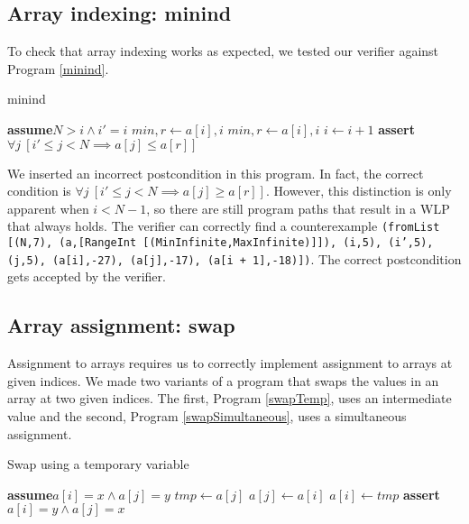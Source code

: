 \documentclass[a4paper]{article}
\newcommand{\Assert}{\State\textbf{assert}\xspace}
\newcommand{\Assume}{\State\textbf{assume}\xspace}
\begin{document}
\subsection{Array indexing: minind}

To check that array indexing works as expected, we tested our verifier against Program \ref{minind}.
\begin{algorithm}\label{minind}
\caption{minind}
\begin{algorithmic}
\Assume $N > i \wedge i' = i$
	\State $\textit{min}, r \gets a[i], i$
			\State $\textit{min}, r \gets a[i], i$
		\EndIf
		\State $i \gets i+1$
	\EndWhile
\EndVar
\Assert $\forall j\ [i' \leq j < N \implies a[j] \leq a[r]]$
\end{algorithmic}
\end{algorithm}

We inserted an incorrect postcondition in this program. In fact, the correct condition is $\forall j\ [i' \leq j < N \implies a[j] \geq a[r]]$. However, this distinction is only apparent when $i < N - 1$, so there are still program paths that result in a WLP that always holds. The verifier can correctly find a counterexample \texttt{(fromList [(N,7), (a,[RangeInt [(MinInfinite,MaxInfinite)]]), (i,5), (i',5), (j,5), (a[i],-27), (a[j],-17), (a[i + 1],-18)])}. The correct postcondition gets accepted by the verifier.

\subsection{Array assignment: swap}

Assignment to arrays requires us to correctly implement assignment to arrays at given indices. We made two variants of a program that swaps the values in an array at two given indices. The first, Program \ref{swapTemp}, uses an intermediate value and the second, Program \ref{swapSimultaneous}, uses a simultaneous assignment.

\begin{algorithm}\label{swapTemp}
\caption{Swap using a temporary variable}
\begin{algorithmic}
\Assume $a[i] = x \wedge a[j] = y$
\State $\textit{tmp} \gets a[j]$
\State $a[j] \gets a[i]$
\State $a[i] \gets \textit{tmp}$
\EndVar
\Assert $a[i] = y \wedge a[j] = x$
\end{algorithmic}
\end{algorithm}
\end{document}
